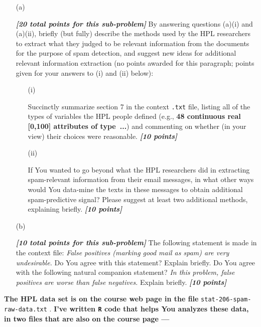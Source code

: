 \documentclass[12pt]{article}
\newcommand{\bi}[1]{\textbf{\textit{#1}}}
\begin{document}
\begin{itemize}

\item[(a)]

\bi{[20 total points for this sub-problem]} By answering questions (a)(i) and (a)(ii), briefly (but fully) describe the methods used by the HPL researchers to extract what they judged to be relevant information from the documents for the purpose of spam detection, and suggest new ideas for additional relevant information extraction (no points awarded for this paragraph; points given for your answers to (i) and (ii) below):

\begin{itemize}

\item[(i)]

Succinctly summarize section 7 in the context \texttt{.txt} file, listing all of the types of variables the HPL people defined (e.g., \textbf{48 continuous real [0,100] attributes of type~...}) and commenting on whether (in your view) their choices were reasonable. \bi{[10 points]}

\item[(ii)]

If You wanted to go beyond what the HPL researchers did in extracting spam-relevant information from their email messages, in what other ways would You data-mine the texts in these messages to obtain additional spam-predictive signal? Please suggest at least two additional methods, explaining briefly. \bi{[10 points]} 

\end{itemize}

\item[(b)]

\bi{[10 total points for this sub-problem]} The following statement is made in the context file: \textit{False positives (marking good mail as spam) are very undesirable.} Do You agree with this statement? Explain briefly. Do You agree with the following natural companion statement? \textit{In this problem, false positives are worse than false negatives.} Explain briefly. \bi{[10 points]}

\end{itemize}

\textbf{The HPL data set is on the course web page in the file} \texttt{stat-206-spam-raw-data.txt} . \textbf{I've written \texttt{R} code that helps You analyzes these data, in two files that are also on the course page ---} 
\end{document}
